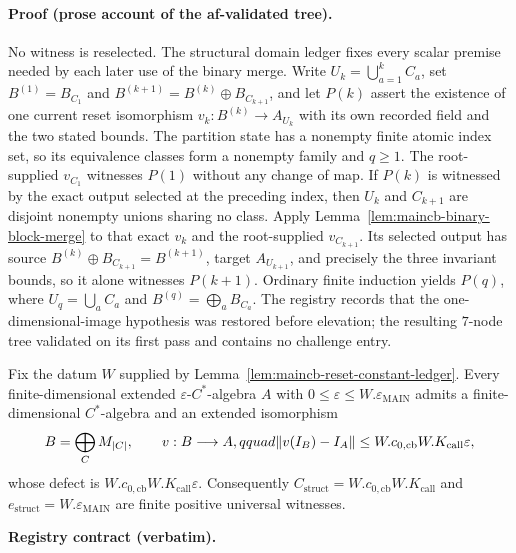 \paragraph{Proof (prose account of the af-validated tree).}
No witness is reselected.  The structural domain ledger fixes every scalar premise needed
by each later use of the binary merge.  Write
$U_k=\bigcup_{a=1}^k C_a$, set $B^{(1)}=B_{C_1}$ and
$B^{(k+1)}=B^{(k)}\oplus B_{C_{k+1}}$, and let $P(k)$ assert the existence of one current
reset isomorphism $v_k:B^{(k)}\to A_{U_k}$ with its own recorded field and the two stated
bounds.  The partition state has a nonempty finite atomic index set, so its equivalence
classes form a nonempty family and $q\ge1$.
The root-supplied $v_{C_1}$ witnesses $P(1)$ without any change of map.  If $P(k)$ is
witnessed by the exact output selected at the preceding index, then $U_k$ and $C_{k+1}$
are disjoint nonempty unions sharing no class.  Apply
Lemma~\ref{lem:maincb-binary-block-merge} to that exact $v_k$ and the root-supplied
$v_{C_{k+1}}$.  Its selected output has source
$B^{(k)}\oplus B_{C_{k+1}}=B^{(k+1)}$, target $A_{U_{k+1}}$, and precisely the three
invariant bounds, so it alone witnesses $P(k+1)$.  Ordinary finite induction yields
$P(q)$, where $U_q=\bigcup_aC_a$ and $B^{(q)}=\bigoplus_aB_{C_a}$.  The registry records
that the one-dimensional-image hypothesis was restored before elevation; the resulting
$7$-node tree validated on its first pass and contains no challenge entry.
\begin{lemma}\label{lem:maincb-structural-assembly}
Fix the datum $W$ supplied by Lemma~\ref{lem:maincb-reset-constant-ledger}.  Every finite-dimensional extended $\varepsilon$-$C^*$-algebra $A$ with
$0\le\varepsilon\le W.\varepsilon_{\mathrm{MAIN}}$ admits a finite-dimensional
$C^*$-algebra and an extended isomorphism
\[
 B=\bigoplus_C M_{|C|},\qquad v:B\longrightarrow A,qquad
 \lVert v(I_B)-I_A\rVert\le W.c_{0,\mathrm{cb}}W.K_{\mathrm{call}}\varepsilon,
\]
whose defect is $W.c_{0,\mathrm{cb}}W.K_{\mathrm{call}}\varepsilon$.  Consequently
$C_{\mathrm{struct}}=W.c_{0,\mathrm{cb}}W.K_{\mathrm{call}}$ and
$e_{\mathrm{struct}}=W.\varepsilon_{\mathrm{MAIN}}$ are finite positive universal witnesses.
\end{lemma}
\noindent\textbf{Registry contract (verbatim).}

